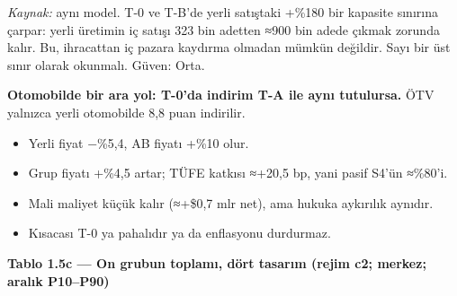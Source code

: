 \endgroup

\emph{Kaynak:} \etiketT{} aynı model. T-0 ve T-B'de yerli satıştaki +\%180 bir kapasite sınırına çarpar: yerli üretimin iç satışı 323 bin adetten ≈900 bin adede çıkmak zorunda kalır. Bu, ihracattan iç pazara kaydırma olmadan mümkün değildir. Sayı bir üst sınır olarak okunmalı. Güven: Orta.

\textbf{Otomobilde bir ara yol: T-0'da indirim T-A ile aynı tutulursa.} ÖTV yalnızca yerli otomobilde 8,8 puan indirilir.

\begin{itemize}
\tightlist
\item
  Yerli fiyat −\%5,4, AB fiyatı +\%10 olur.
\item
  Grup fiyatı +\%4,5 artar; TÜFE katkısı ≈+20,5 bp, yani pasif S4'ün ≈\%80'i.
\item
  Mali maliyet küçük kalır (≈+\$0,7 mlr net), ama hukuka aykırılık aynıdır.
\item
  Kısacası T-0 ya pahalıdır ya da enflasyonu durdurmaz. \etiketT{}
\end{itemize}


\textbf{Tablo 1.5c --- On grubun toplamı, dört tasarım (rejim c2; merkez; aralık P10--P90)}

\nopagebreak[4]

\begingroup\gbtablo\footnotesize

